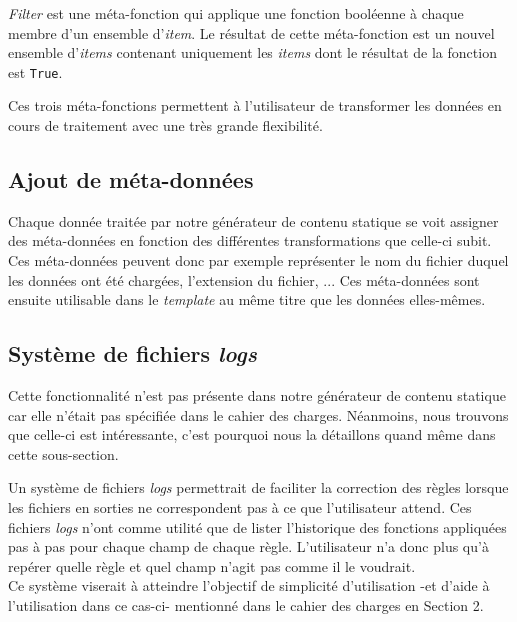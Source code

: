 		\textit{Filter} est une méta-fonction qui applique une fonction booléenne à chaque membre d'un ensemble d'\textit{item}. Le résultat de cette méta-fonction est un nouvel ensemble d'\textit{items} contenant uniquement les \textit{items} dont le résultat de la fonction est \texttt{True}.
		
		Ces trois méta-fonctions permettent à l'utilisateur de transformer les données en cours de traitement avec une très grande flexibilité.
	
	\subsection{Ajout de méta-données}
	
		Chaque donnée traitée par notre générateur de contenu statique se voit assigner des méta-données en fonction des différentes transformations que celle-ci subit. Ces méta-données peuvent donc par exemple représenter le nom du fichier duquel les données ont été chargées, l'extension du fichier, ... Ces méta-données sont ensuite utilisable dans le \textit{template} au même titre que les données elles-mêmes.
	
	\subsection{Système de fichiers \textit{logs}}
	
		\begin{note}
			Cette fonctionnalité n'est pas présente dans notre générateur de contenu statique car elle n'était pas spécifiée dans le cahier des charges. Néanmoins, nous trouvons que celle-ci est intéressante, c'est pourquoi nous la détaillons quand même dans cette sous-section.
		\end{note}
	
		Un système de fichiers \textit{logs} permettrait de faciliter la correction des règles lorsque les fichiers en sorties ne correspondent pas à ce que l'utilisateur attend. Ces fichiers \textit{logs} n'ont comme utilité que de lister l'historique des fonctions appliquées pas à pas pour chaque champ de chaque règle. L'utilisateur n'a donc plus qu'à repérer quelle règle et quel champ n'agit pas comme il le voudrait.\\
		
		Ce système viserait à atteindre l'objectif de simplicité d'utilisation -et d'aide à l'utilisation dans ce cas-ci- mentionné dans le cahier des charges en Section 2.
		
		